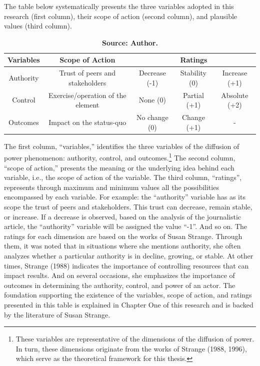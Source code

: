 The table below systematically presents the three variables adopted in this research (first column), their scope of action (second column), and plausible values (third column).

\begin{table}[ht]
    \centering
    \caption{\textbf{The Diffusion of Power's Variables}} %
    \begin{tabular}{|c|c|c|c|c|}
        \hline
        \multicolumn{1}{|c|}{\textbf{Variables}} & \multicolumn{1}{c|}{\textbf{Scope of Action}} & \multicolumn{3}{c|}{\textbf{Ratings}} \\ \hline
        
        Authority & Trust of peers and stakeholders & Decrease (-1) & Stability (0) & Increase (+1) \\ \hline
        Control   & Exercise/operation of the element   & None (0)   & Partial (+1)   & Absolute (+2)   \\ \hline
        Outcomes   & Impact on the status-quo   & No change (0)   & Change (+1)   & -  \\ \hline
    \end{tabular}
    
    \caption*{\textbf{Source: Author.}}
\end{table}

The first column, “variables,” identifies the three variables of the diffusion of power phenomenon: authority, control, and outcomes.\footnote{These variables are representative of the dimensions of the diffusion of power. In turn, these dimensions originate from the works of Strange (1988, 1996), which serve as the theoretical framework for this thesis. }
The second column, “scope of action,” presents the meaning or the underlying idea behind each variable, i.e., the scope of action of the variable. The third column, “ratings”, represents through maximum and minimum values all the possibilities encompassed by each variable. For example: the “authority” variable has as its scope the trust of peers and stakeholders. This trust can decrease, remain stable, or increase. If a decrease is observed, based on the analysis of the journalistic article, the “authority” variable will be assigned the value “-1”. And so on. The ratings for each dimension are based on the works of Susan Strange. Through them, it was noted that in situations where she mentions authority, she often analyzes whether a particular authority is in decline, growing, or stable. At other times, Strange (1988) indicates the importance of controlling resources that can impact results. And on several occasions, she emphasizes the importance of outcomes in determining the authority, control, and power of an actor. The foundation supporting the existence of the variables, scope of action, and ratings presented in this table is explained in Chapter One of this research and is backed by the literature of Susan Strange.


